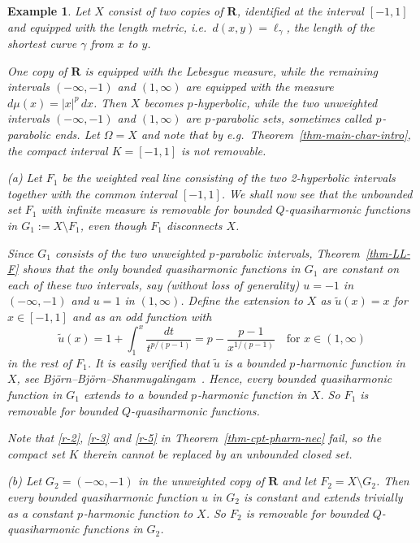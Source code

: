 \documentclass[a4paper,twoside]{article}
\theoremstyle{propositional}
\theoremstyle{descriptive}
\newtheorem{example}[thm]{Example}
\theoremstyle{remarkstyle}
\newcommand{\setm}{\setminus}
\newcommand{\Om}{\Omega}
\newcommand{\ga}{\gamma}
\newcommand{\p}{{$p\mspace{1mu}$}}
\newcommand{\R}{\mathbf{R}}
\newcommand{\ut}{\tilde{u}}
\numberwithin{equation}{section}
\begin{document}
\begin{example} \label{ex-two-R}
Let $X$ consist of two copies of $\R$, identified at the interval $[-1,1]$
and equipped with the length metric,
i.e.\ $d(x,y)=\ell_{\ga}$, the length of the shortest curve $\ga$ from $x$ to $y$.

One copy of $\R$ is equipped with the Lebesgue measure, while the remaining 
intervals $(-\infty,-1)$ and $(1,\infty)$ are equipped with the measure 
$d\mu(x) = |x|^p\,dx$.
Then $X$ becomes \p-hyperbolic,
while the two unweighted 
intervals $(-\infty,-1)$ and $(1,\infty)$ are \p-parabolic sets,
sometimes called \p-parabolic ends.
Let $\Om=X$ and note that by e.g.\ Theorem~\ref{thm-main-char-intro}, 
the compact interval $K=[-1,1]$ is not removable.

(a)
Let $F_1$ be the weighted real line consisting of the two
2-hyperbolic intervals together with the common interval $[-1,1]$.
We shall now see that the unbounded set $F_1$ with infinite measure is removable 
for bounded $Q$-quasiharmonic functions in $G_1:=X\setm F_1$,
even though $F_1$ disconnects $X$.

Since $G_1$ consists of the two unweighted \p-parabolic intervals,
Theorem~\ref{thm-LL-F} shows that
the only bounded quasiharmonic functions in $G_1$ 
are constant on each of these two intervals, say (without loss of generality) 
$u=-1$ in $(-\infty,-1)$ and $u=1$ in $(1,\infty)$.
Define the extension to $X$ as $\ut(x)=x$ for $x\in [-1,1]$ and 
as an odd function with
\begin{equation}   \label{eq-ext-by-int}
\ut(x)= 1 + \int_1^x \frac{dt}{t^{p/(p-1)}} 
= p- \frac{p-1}{x^{1/(p-1)}}
\quad \text{for } x\in (1,\infty)
\end{equation}
in the rest of $F_1$.
It is easily verified that $\ut$ is a bounded \p-harmonic function in $X$,
see Bj\"orn--Bj\"orn--Shan\-mu\-ga\-lin\-gam~\cite[Lemma~6.2]{BBSliouville}.
Hence, every bounded quasiharmonic function in $G_1$ extends to a bounded
\p-harmonic function in $X$.
So $F_1$ is removable for bounded $Q$-quasiharmonic functions.

Note that \ref{r-2}, \ref{r-3} and \ref{r-5} in Theorem~\ref{thm-cpt-pharm-nec}
fail, so the compact set $K$ therein cannot be replaced by an unbounded closed set.

(b)
Let $G_2=(-\infty,-1)$ in the unweighted copy of $\R$ and let $F_2=X\setm G_2$.
Then every bounded quasiharmonic function $u$ in $G_2$ is constant 
and extends trivially as a constant \p-harmonic function to $X$.
So $F_2$ is removable 
for bounded $Q$-quasiharmonic functions in $G_2$.


\end{example}
\end{document}

